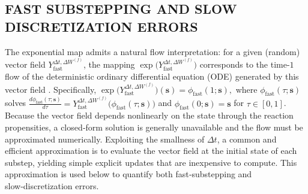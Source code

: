\documentclass{article}
\begin{document}







\subsection{FAST SUBSTEPPING AND SLOW DISCRETIZATION ERRORS}
\label{subsec:substepping_order}


The exponential map admits a natural flow interpretation: for a given (random) vector
field $Y_{\mathrm{fast}}^{\Delta t,\Delta W^{(f)}}$, the mapping
$\exp\!\big(Y_{\mathrm{fast}}^{\Delta t,\Delta W^{(f)}}\big)$ corresponds to
the time-$1$ flow of the deterministic ordinary differential equation (ODE)
generated by this vector field \cite{Misawa2000}. Specifically, 
$
\exp\!\big(Y_{\mathrm{fast}}^{\Delta t,\Delta W^{(f)}}\big)(\pmb{s})
= \phi_{\mathrm{fast}}(1;\pmb{s}),
$
where $\phi_{\mathrm{fast}}(\tau;\pmb{s})$ solves
$
\frac{d\phi_{\mathrm{fast}}(\tau;\pmb{s})}{d\tau}
= Y_{\mathrm{fast}}^{\Delta t,\Delta W^{(f)}}\!\big(\phi_{\mathrm{fast}}(\tau;\pmb{s})\big)$
 and $\phi_{\mathrm{fast}}(0;\pmb{s})=\pmb{s} 
$ for $ \tau \in [0,1]$.
Because the vector field depends nonlinearly on the state through the reaction propensities, a closed‑form solution is generally unavailable and the flow must be approximated numerically. 
Exploiting the smallness of $\Delta t$, a common and efficient approximation is to evaluate the vector field at the initial state of each substep, yielding simple explicit updates that are inexpensive to compute. This approximation is used below to quantify both fast‑substepping and slow‑discretization errors.

\end{document}
